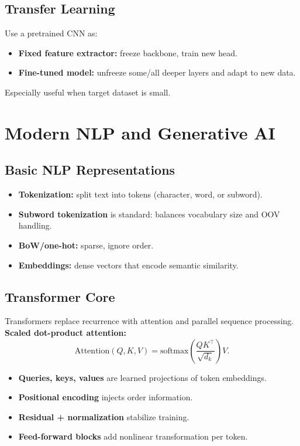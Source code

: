 \documentclass[10pt,twocolumn]{article}
\newcommand{\chead}[1]{\vspace{0.15em}\textbf{#1:} }
\begin{document}
\subsection{Transfer Learning}
Use a pretrained CNN as:
\begin{itemize}
  \item \textbf{Fixed feature extractor:} freeze backbone, train new head.
  \item \textbf{Fine-tuned model:} unfreeze some/all deeper layers and adapt to new data.
\end{itemize}
Especially useful when target dataset is small.

\section{Modern NLP and Generative AI}
\subsection{Basic NLP Representations}
\begin{itemize}
  \item \textbf{Tokenization:} split text into tokens (character, word, or subword).
  \item \textbf{Subword tokenization} is standard: balances vocabulary size and OOV handling.
  \item \textbf{BoW/one-hot:} sparse, ignore order.
  \item \textbf{Embeddings:} dense vectors that encode semantic similarity.
\end{itemize}

\subsection{Transformer Core}
Transformers replace recurrence with attention and parallel sequence processing.
\chead{Scaled dot-product attention}
\[
\mathrm{Attention}(Q,K,V)=\mathrm{softmax}\!\left(\frac{QK^\top}{\sqrt{d_k}}\right)V.
\]
\begin{itemize}
  \item \textbf{Queries, keys, values} are learned projections of token embeddings.
  \item \textbf{Positional encoding} injects order information.
  \item \textbf{Residual + normalization} stabilize training.
  \item \textbf{Feed-forward blocks} add nonlinear transformation per token.
\end{itemize}
\end{document}
